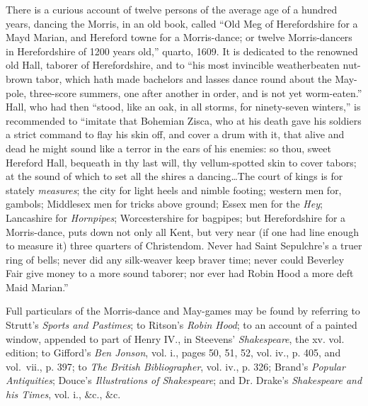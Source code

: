 There is a curious account of twelve persons of the average age of a hundred
years, dancing the Morris, in an old book, called “Old Meg of Herefordshire for
a Mayd Marian, and Hereford towne for a Morris-dance; or twelve Morris-dancers
in Herefordshire of 1200 years old,”
 quarto, 1609. It is dedicated to the renowned
old Hall, taborer of Herefordshire, and to “his most invincible weatherbeaten
nut-brown tabor, which hath made bachelors and lasses dance round
about the May-pole, three-score summers, one after another in order, and is not
yet worm-eaten.” Hall, who had then “stood, like an oak, in all storms, for
ninety-seven winters,” is recommended to “imitate that Bohemian Zisca, who at
his death gave his soldiers a strict command to flay his skin off, and cover a drum
with it, that alive and dead he might sound like a terror in the ears of his enemies: 
so thou, sweet Hereford Hall, bequeath \pagebreak in thy last will, thy vellum-spotted skin
to cover tabors; at the sound of which to set all the shires a dancing\dots The
court of kings is for stately \textit{measures}; the city for light heels and nimble footing;
western men for, gambols; Middlesex men for tricks above ground; Essex men
for the \textit{Hey}; Lancashire for \textit{Hornpipes}; Worcestershire for bagpipes; but Herefordshire
for a Morris-dance, puts down not only all Kent, but very near (if one
had line enough to measure it) three quarters of Christendom. Never had Saint
Sepulchre’s a truer ring of bells; never did any silk-weaver keep braver time;
never could Beverley Fair give money to a more sound taborer; nor ever had
Robin Hood a more deft Maid Marian.”

Full particulars of the Morris-dance and May-games may be found by referring
to Strutt’s \textit{Sports and Pastimes}; to Ritson’s \textit{Robin Hood}; to an account of a
painted window, appended to part of Henry IV., in Steevens’ \textit{Shakespeare}, the
xv. vol. edition; to Gifford’s \textit{Ben Jonson}, vol. i., pages 50, 51, 52, vol. iv., p. 405,
and vol.~vii., p. 397; to \textit{The British Bibliographer}, vol. iv., p. 326; Brand’s
\textit{Popular Antiquities}; Douce’s \textit{Illustrations of Shakespeare}; and Dr. Drake’s
\textit{Shakespeare and his Times}, vol. i., \&c., \&c.

